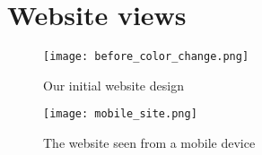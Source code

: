 \chapter{Website views}\label{appendix:websiteViews}

\begin{figure}[h!]
	\texttt{[image: before\_color\_change.png]}
	\caption{Our initial website design}
	\label{fig:old_website_design}
\end{figure}

\begin{figure}[h!]
	\texttt{[image: mobile\_site.png]}
	\caption{The website seen from a mobile device}
	\label{fig:mobileView}
\end{figure}
